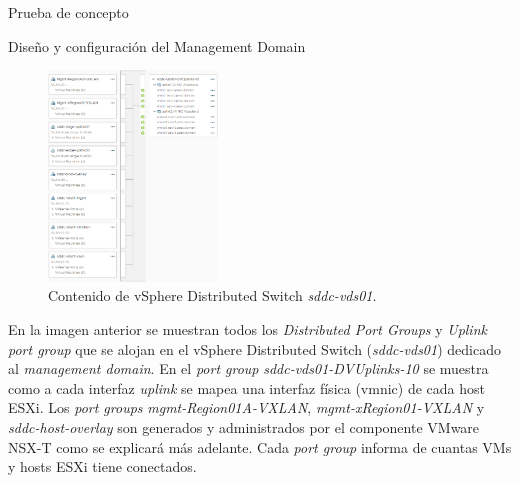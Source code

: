 \begin{section}{Prueba de concepto}
\begin{subsection}{Diseño y configuración del Management Domain}
\begin{itemize}
    \end{itemize}
    \begin{figure}[h]
      \centering
      \includegraphics[width=0.4\textwidth]{imaxes/pruebaconcepto/distributedSwitchEntornoFinal.png}
      \caption{Contenido de vSphere Distributed Switch \textit{sddc-vds01}.}
      \label{fig:port-groups-vSwitch-vSphere}
    \end{figure}
    \FloatBarrier
    En la imagen anterior se muestran todos los \textit{Distributed Port Groups} y \textit{Uplink port group} que se alojan en el vSphere Distributed Switch (\textit{sddc-vds01}) dedicado al \textit{management domain}. En el \textit{port group} \textit{sddc-vds01-DVUplinks-10} se muestra como a cada interfaz \textit{uplink} se mapea una interfaz física (vmnic) de cada host ESXi. Los \textit{port groups} \textit{mgmt-Region01A-VXLAN}, \textit{mgmt-xRegion01-VXLAN} y \textit{sddc-host-overlay} son generados y administrados por el componente VMware NSX-T como se explicará más adelante. Cada \textit{port group} informa de cuantas VMs y hosts ESXi tiene conectados.


\end{subsection}
\end{section}
